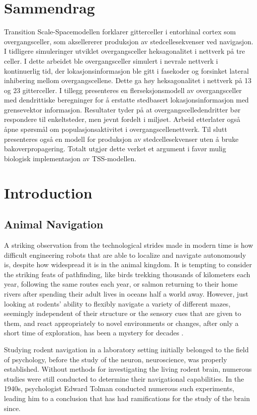 \documentclass{article}
\begin{document}
    \newpage
    \section*{Sammendrag}
    Transition Scale-Spacemodellen forklarer gitterceller i entorhinal cortex som overgangsceller, som aksellererer produksjon av stedcellesekvenser ved navigasjon. I tidligere simuleringer utviklet overgangsceller heksagonalitet i nettverk på tre celler. I dette arbeidet ble overgangsceller simulert i nevrale nettverk i kontinuerlig tid, der lokasjonsinformasjon ble gitt i fasekoder og forsinket lateral inhibering mellom overgangscellene. Dette ga høy heksagonalitet i nettverk på 13 og 23 gitterceller. I tillegg presenteres en flerseksjonsmodell av overgangsceller med dendrittiske beregninger for å erstatte stedbasert lokasjonsinformasjon med grensevektor informasjon. Resultater tyder på at overgangscelledendritter bør respondere til enkeltsteder, men jevnt fordelt i miljøet. Arbeid etterlater også åpne spørsmål om populasjonsaktivitet i overgangscellenettverk. Til slutt presenteres også en modell for produksjon av stedcellesekvenser uten å bruke bakoverpropagering. Totalt utgjør dette verket et argument i favør mulig biologisk implementasjon av TSS-modellen.  


    \newpage
    \section{Introduction}
    \subsection{Animal Navigation} \label{Animal Navigation}
    A striking observation from the technological strides made in modern time is how difficult engineering robots that are able to localize and navigate autonomously is, despite how widespread it is in the animal kingdom. It is tempting to consider the striking feats of pathfinding, like birds trekking thousands of kilometers each year, following the same routes each year, or salmon returning to their home rivers after spending their adult lives in oceans half a world away. However, just looking at rodents' ability to flexibly navigate a variety of different mazes, seemingly independent of their structure or the sensory cues that are given to them, and react appropriately to novel environments or changes, after only a short time of exploration, has been a mystery for decades \parencite{Wynn2023}.

    Studying rodent navigation in a laboratory setting initially belonged to the field of psychology, before the study of the neuron, neuroscience, was properly established. Without methods for investigating the living rodent brain, numerous studies were still conducted to determine their navigational capabilities. In the 1940s, psychologist Edward Tolman conducted numerous such experiments, leading him to a conclusion that has had ramifications for the study of the brain since. 
    
\end{document}
